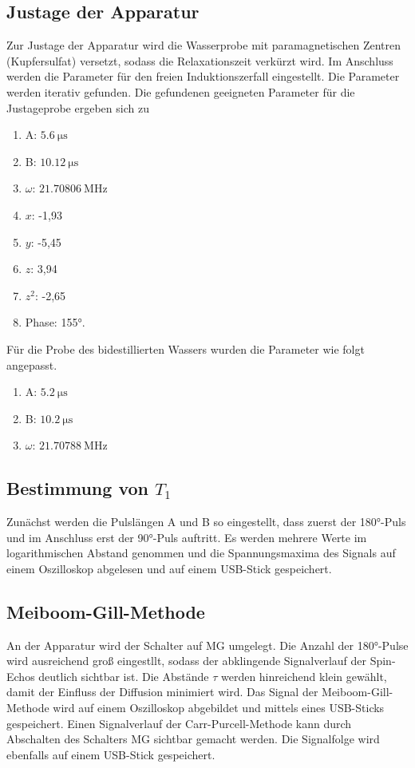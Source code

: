 \subsection{Justage der Apparatur}
Zur Justage der Apparatur wird die Wasserprobe mit paramagnetischen Zentren (Kupfersulfat)
versetzt, sodass die Relaxationszeit verkürzt wird. Im Anschluss werden die Parameter
für den freien Induktionszerfall eingestellt.
Die Parameter werden iterativ gefunden. Die gefundenen geeigneten Parameter für die
Justageprobe ergeben sich zu
\begin{enumerate}
  \item A: $\SI{5,6}{\micro\second}$
  \item B: $\SI{10,12}{\micro\second}$
  \item $\omega$: $\SI{21,70806}{\mega\hertz}$
  \item $x$: -1,93
  \item $y$: -5,45
  \item $z$: 3,94
  \item $z^2$: -2,65
  \item Phase: 155°.
\end{enumerate}
Für die Probe des bidestillierten Wassers wurden die Parameter wie folgt angepasst.
\begin{enumerate}
  \item A: $\SI{5,2}{\micro\second}$
  \item B: $\SI{10,2}{\micro\second}$
  \item $\omega$: $\SI{21,70788}{\mega\hertz}$
\end{enumerate}

\subsection{Bestimmung von $T_1$}

Zunächst werden die Pulslängen A und B so eingestellt, dass zuerst der 180°-Puls und im
Anschluss erst der 90°-Puls auftritt. Es werden mehrere Werte im logarithmischen Abstand
genommen und die Spannungsmaxima des Signals auf einem Oszilloskop abgelesen und
auf einem USB-Stick gespeichert.

\subsection{Meiboom-Gill-Methode}

An der Apparatur wird der Schalter auf MG umgelegt. Die Anzahl der 180°-Pulse
wird ausreichend groß eingestllt, sodass der abklingende Signalverlauf der Spin-Echos
deutlich sichtbar ist. Die Abstände $\tau$ werden hinreichend klein gewählt, damit
der Einfluss der Diffusion minimiert wird.
Das Signal der Meiboom-Gill-Methode wird auf einem Oszilloskop abgebildet und mittels
eines USB-Sticks gespeichert.
Einen Signalverlauf der Carr-Purcell-Methode kann durch Abschalten des Schalters MG
sichtbar gemacht werden. Die Signalfolge wird ebenfalls auf einem USB-Stick gespeichert.

